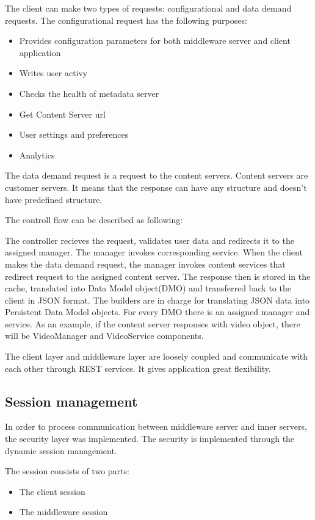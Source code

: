 The client can make two types of requests: configurational and data demand requests.
The configurational request has the following purposes:
\begin{itemize}
	\item Provides configuration parameters for both middleware server and client application
	\item Writes user activy
	\item Checks the health of metadata server
	\item Get Content Server url
	\item User settings and preferences
	\item Analytics
\end{itemize}


The data demand request is a request to the content servers. Content servers are customer servers. It means that the response can have any structure and doesn't have predefined structure. 

The controll flow can be described as following:

The controller recieves the request, validates user data and redirects it to the assigned manager. The manager  invokes corresponding service. When the client makes the data demand request, the manager invokes content services that redirect request to the assigned content server. The response then is stored in the cache, translated into Data Model object(DMO) and transferred back to the client in JSON format. The builders are in charge for translating JSON data into Persistent Data Model objects. For every DMO there is an assigned manager and service. As an example, if the content server responses with video object, there will be VideoManager and VideoService components.   

The client layer and middleware layer are loosely coupled and communicate with each other through REST services. It gives application great flexibility.



\subsection{Session management}


In order to process communication between middleware server and inner servers, the security layer was implemented. The security is implemented through the dynamic session management.

The session consists of two parts: 
\begin{itemize}
	\item The client session
	\item The middleware session
\end{itemize}

